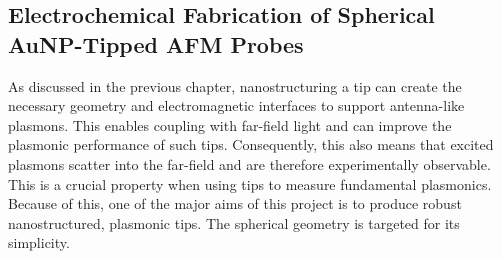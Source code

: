 \documentclass[12pt, a4paper, oneside]{book}
\begin{document}
\begin{singlespace}
\color{black}\chapter{Electrochemical Fabrication of Spherical AuNP-Tipped AFM Probes}
\end{singlespace}


As discussed in the previous chapter, nanostructuring a tip can create the necessary geometry and electromagnetic interfaces to support antenna-like plasmons. This enables coupling with far-field light and can improve the plasmonic performance of such tips. Consequently, this also means that excited plasmons scatter into the far-field and are therefore experimentally observable. This is a crucial property when using tips to measure fundamental plasmonics. Because of this, one of the major aims of this project is to produce robust nanostructured, plasmonic tips. The spherical geometry is targeted for its simplicity.
\end{document}
